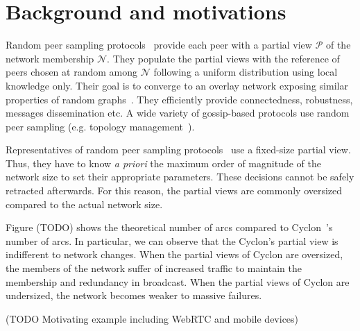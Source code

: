 
\section{Background and motivations}
\label{sec:background}

Random peer sampling protocols~\cite{jelasity2004peer} provide each peer with a
partial view $\mathcal{P}$ of the network membership $\mathcal{N}$. They
populate the partial views with the reference of peers chosen at random among
$\mathcal{N}$ following a uniform distribution using local knowledge
only. Their goal is to converge to an overlay network exposing similar
properties of random graphs~\cite{erdos1959random}. They efficiently provide
connectedness, robustness, messages dissemination etc. A wide variety of
gossip-based protocols use random peer sampling (e.g. topology
management~\cite{voulgaris2005epidemic, jelasity2009tman, dabek2004vivaldi}).

Representatives of random peer sampling protocols~\cite{voulgaris2005cyclon,
  eugster2003lightweight, tolgyeski2009adaptive} use a fixed-size partial view.
Thus, they have to know \emph{a priori} the maximum order of magnitude of the
network size to set their appropriate parameters. These decisions cannot be
safely retracted afterwards. For this reason, the partial views are commonly
oversized compared to the actual network size.

Figure (TODO) shows the theoretical number of arcs compared to
Cyclon~\cite{voulgaris2005cyclon}'s number of arcs. In particular, we can
observe that the Cyclon's partial view is indifferent to network changes.  When
the partial views of Cyclon are oversized, the members of the network suffer of
increased traffic to maintain the membership and redundancy in broadcast. When
the partial views of Cyclon are undersized, the network becomes weaker to
massive failures.

(TODO Motivating example including WebRTC and mobile devices)

